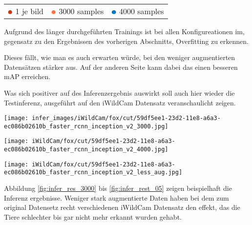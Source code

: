 \begin{table}[htb]
  \centering
  \begin{tabular}{m{}<{\centering}m{}<{\centering}m{}<{\centering}}
    $\color[HTML]{CC3311}\medbullet$  1 je bild & $\color[HTML]{FF7043}\medbullet$  3000 samples & $\color[HTML]{0077BB}\medbullet$  4000 samples
  \end{tabular}    
\end{table}

Aufgrund des länger durchgeführten Trainings ist bei allen Konfigureationen
im, gegensatz zu den Ergebnissen des vorherigen Abschnitts, Overfitting 
zu erkennen.

Dieses fällt, wie man es auch erwarten würde, bei den weniger  
augmentierten Datensätzen stärker aus. 
Auf der anderen Seite kann dabei das einen besseren mAP erreichen.

Was sich positiver auf des Inferenzergebnis auswirkt 
soll auch hier wieder die Testinferenz, ausgeführt 
auf den iWildCam Datensatz veranschaulicht zeigen.


\vspace{1cm}
\begin{minipage}{0.333\textwidth}
  \centering
  \label{fig:infer_res_3000}
  \texttt{[image: infer\_images/iWildCam/fox/cut/59df5ee1-23d2-11e8-a6a3-ec086b02610b\_faster\_rcnn\_inception\_v2\_3000.jpg]}
\end{minipage}
\begin{minipage}{0.333\textwidth}
  \centering
  \label{fig:infer_res_4000}
  \texttt{[image: iWildCam/fox/cut/59df5ee1-23d2-11e8-a6a3-ec086b02610b\_faster\_rcnn\_inception\_v2\_4000.jpg]}
\end{minipage}
\begin{minipage}{0.333\textwidth}
  \centering
  \label{fig:infer_rest_05}
  \texttt{[image: iWildCam/fox/cut/59df5ee1-23d2-11e8-a6a3-ec086b02610b\_faster\_rcnn\_inception\_v2\_less\_aug.jpg]}
\end{minipage}
\vspace{1cm}

Abbildung \ref{fig:infer_res_3000} bis \ref{fig:infer_rest_05}
zeigen beispielhaft die Inferenz ergebnisse.
Weniger stark augmentierte Daten haben bei dem zum original 
Datensetz recht verschiedenen iWildCam Datensatz den effekt, 
das die Tiere schlechter bis gar nicht mehr erkannt wurden gehabt.



